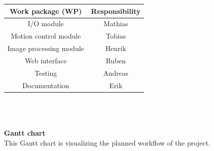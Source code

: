 \documentclass[11pt]{article}
\begin{document}
\begin{tabular}{ |c|c| }
    \hline
    \textbf{Work package (WP)} & \textbf{Responsibility} \\
    \hline
    I/O module & Mathias \\
    \hline
    Motion control module & Tobias \\
    \hline
    Image processing module & Henrik \\
    \hline
    Web interface & Ruben \\
    \hline
    Testing & Andreas \\
    \hline
    Documentation & Erik \\
    \hline
\end{tabular}
\\\\\\
\textbf{Gantt chart}
\\
This Gantt chart is visualizing the planned workflow of the project. 
\end{document}
